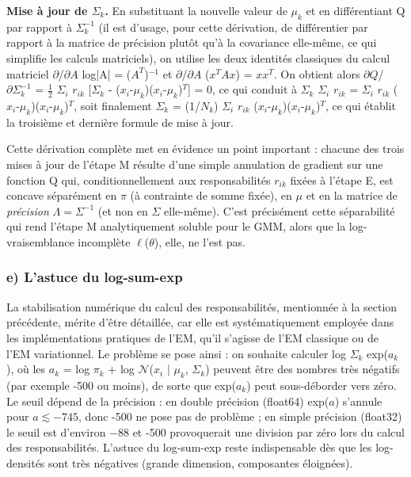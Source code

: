 \textbf{Mise à jour de $\Sigma _{k}$. }En substituant la nouvelle valeur de $\mu _{k}$ et en différentiant Q par rapport à $\Sigma _{k}^{-1}$ (il est d'usage, pour cette dérivation, de différentier par rapport à la matrice de précision plutôt qu'à la covariance elle-même, ce qui simplifie les calculs matriciels), on utilise les deux identités classiques du calcul matriciel $\partial $/$\partial A$ log|A| = ($A^{T}$)$^{-1}$ et $\partial $/$\partial A$ ($x^{T}Ax$) = $xx^{T}$. On obtient alors $\partial Q$/$\partial \Sigma _{k}^{-1}$ = $\tfrac{1}{2}$ $\Sigma _{i}$ $r_{ik}$ [$\Sigma _{k}$ - ($x_{i}$-$\mu _{k}$)($x_{i}$-$\mu _{k}$)$^{T}$] = 0, ce qui conduit à $\Sigma _{k}$ $\Sigma _{i}$ $r_{ik}$ = $\Sigma _{i}$ $r_{ik}$ ($x_{i}$-$\mu _{k}$)($x_{i}$-$\mu _{k}$)$^{T}$, soit finalement $\Sigma _{k}$ = (1/$N_{k}$) $\Sigma _{i}$ $r_{ik}$ ($x_{i}$-$\mu _{k}$)($x_{i}$-$\mu _{k}$)$^{T}$, ce qui établit la troisième et dernière formule de mise à jour.

Cette dérivation complète met en évidence un point important : chacune des trois mises à jour de l'étape M résulte d'une simple annulation de gradient sur une fonction Q qui, conditionnellement aux responsabilités $r_{ik}$ fixées à l'étape E, est concave séparément en $\pi$ (à contrainte de somme fixée), en $\mu$ et en la matrice de \emph{précision} $\Lambda = \Sigma^{-1}$ (et non en $\Sigma$ elle-même). C'est précisément cette séparabilité qui rend l'étape M analytiquement soluble pour le GMM, alors que la log-vraisemblance incomplète $\ell $($\theta $), elle, ne l'est pas.

\subsubsection{e) L'astuce du log-sum-exp}
La stabilisation numérique du calcul des responsabilités, mentionnée à la section précédente, mérite d'être détaillée, car elle est systématiquement employée dans les implémentations pratiques de l'EM, qu'il s'agisse de l'EM classique ou de l'EM variationnel. Le problème se pose ainsi : on souhaite calculer log $\Sigma _{k}$ exp($a_{k}$), où les $a_{k}$ = log $\pi _{k}$ + log $\mathcal{N}$($x_{i}$ | $\mu _{k}$, $\Sigma _{k}$) peuvent être des nombres très négatifs (par exemple -500 ou moins), de sorte que exp($a_{k}$) peut sous-déborder vers zéro. Le seuil dépend de la précision : en double précision (float64) exp($a$) s'annule pour $a \lesssim -745$, donc -500 ne pose pas de problème ; en simple précision (float32) le seuil est d'environ $-88$ et -500 provoquerait une division par zéro lors du calcul des responsabilités. L'astuce du log-sum-exp reste indispensable dès que les log-densités sont très négatives (grande dimension, composantes éloignées).

